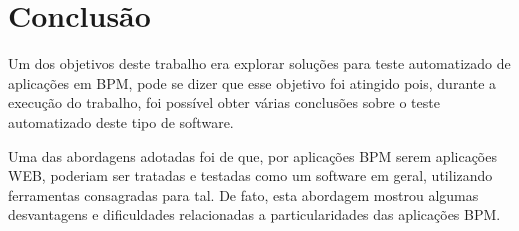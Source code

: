 \documentclass[12pt]{article}
\begin{document}



\section{Conclusão}
Um dos objetivos deste trabalho era explorar soluções para teste automatizado de aplicações em BPM, pode se dizer que esse objetivo foi atingido pois, durante a execução do trabalho, foi possível obter várias conclusões sobre o teste automatizado deste tipo de software.

Uma das abordagens adotadas foi de que, por aplicações BPM serem aplicações WEB, poderiam ser tratadas e testadas como um software em geral, utilizando ferramentas consagradas para tal. De fato, esta abordagem mostrou algumas desvantagens e dificuldades relacionadas a particularidades das aplicações BPM.
\end{document}

